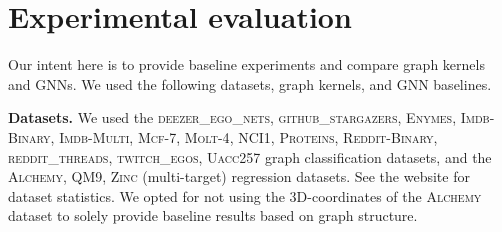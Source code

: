 \documentclass{article}
\newcommand{\xhdr}[1]{{\noindent\bfseries #1}}
\theoremstyle{definition}
\begin{document}
\begin{table}[]\centering	
	\caption{Mean MAE (mean std. MAE, logMAE) on large-scale (multi-target) molecular regression tasks.\label{neural_short_tt}}
\end{table}		
\section{Experimental evaluation}

Our intent here is to provide baseline experiments and compare graph kernels and GNNs. We used the following datasets, graph kernels, and GNN baselines.

\xhdr{Datasets.} We used the \textsc{deezer\_ego\_nets}, \textsc{github\_stargazers}, \textsc{Enymes}, \textsc{Imdb-Binary}, \textsc{Imdb-Multi}, \textsc{Mcf-7}, \textsc{Molt-4},    \textsc{NCI1}, \textsc{Proteins},
\textsc{Reddit-Binary},    \textsc{reddit\_threads}, \textsc{twitch\_egos}, \textsc{Uacc257} graph classification datasets, and the \textsc{Alchemy}, \textsc{QM9}, \textsc{Zinc} (multi-target) regression datasets. See the website for dataset statistics. We opted for not using the 3D-coordinates of the \textsc{Alchemy} dataset to solely provide baseline results based on graph structure.
\end{document}
